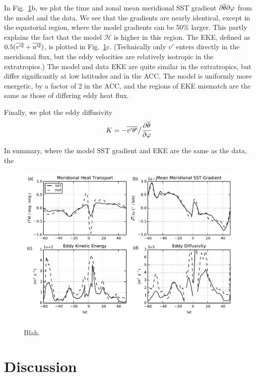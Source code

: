 \documentclass[10pt]{article}
\newcommand{\pd}[2]{ \frac{\partial #1}{\partial #2} }
\newcommand{\ol}{\ensuremath{\overline}}
\begin{document}
In Fig.~\ref{fig:H}b, we plot the time and zonal mean meridional SST gradient $\partial \ol{\theta} \partial \varphi$ from the model and the data. We see that the gradients are nearly identical, except in the equatorial region, where the model gradients can be 50\% larger. This partly explains the fact that the model $\mathcal{H}$ is higher in this region. The EKE, defined as $0.5 ( \ol{v'^2} + \ol{u'^2} )$, is plotted in Fig.~\ref{fig:H}c. (Technically only $v'$ enters directly in the meridional flux, but the eddy velocities are relatively isotropic in the extratropics.) The model and data EKE are quite similar in the extratropics, but differ significantly at low latitudes and in the ACC. The model is uniformly more energetic, by a factor of 2 in the ACC, and the regions of EKE mismatch are the same as those of differing eddy heat flux.

Finally, we plot the eddy diffusivity
\begin{equation}
K = - \ol{v'\theta'} \big / \pd{\ol{\theta}}{\varphi}
\end{equation}


In summary, where the model SST gradient and EKE are the same as the data, the 

\begin{figure}[t!]
  \noindent \includegraphics{../figures/MHT_gradient_EKE_diffusivity.pdf}\\
  \caption{Blah.}
  \label{fig:H}
\end{figure}


\section{Discussion}
\end{document}

